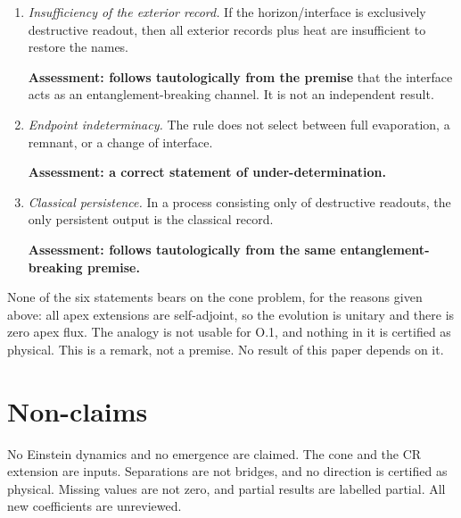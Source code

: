 \documentclass[11pt]{article}
\theoremstyle{definition}
\begin{document}
\begin{enumerate}
\item \emph{Insufficiency of the exterior record.} If the horizon/interface is exclusively destructive readout, then all exterior records plus heat are insufficient to restore the names.

\textbf{Assessment: follows tautologically from the premise} that the interface acts as an entanglement-breaking channel. It is not an independent result.

\item \emph{Endpoint indeterminacy.} The rule does not select between full evaporation, a remnant, or a change of interface.

\textbf{Assessment: a correct statement of under-determination.}

\item \emph{Classical persistence.} In a process consisting only of destructive readouts, the only persistent output is the classical record.

\textbf{Assessment: follows tautologically from the same entanglement-breaking premise.}
\end{enumerate}
None of the six statements bears on the cone problem, for the reasons given above: all apex extensions are self-adjoint, so the evolution is unitary and there is zero apex flux. The analogy is not usable for O.1, and nothing in it is certified as physical.
This is a remark, not a premise. No result of this paper depends on it.

\section*{Non-claims}
No Einstein dynamics and no emergence are claimed. The cone and the CR extension are inputs. Separations are not bridges, and no direction is certified as physical. Missing values are not zero, and partial results are labelled partial. All new coefficients are unreviewed.
\end{document}
